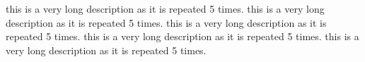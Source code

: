this is a very long description as it is repeated 5 times.
this is a very long description as it is repeated 5 times.
this is a very long description as it is repeated 5 times.
this is a very long description as it is repeated 5 times.
this is a very long description as it is repeated 5 times.
